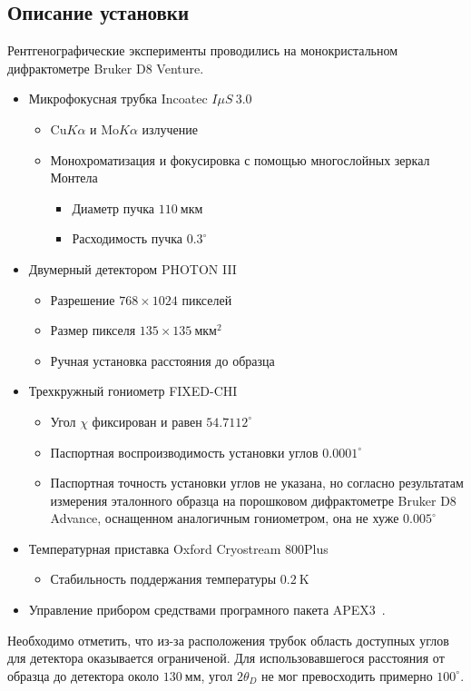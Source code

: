 \documentclass[a4paper, 12pt]{article}
\begin{document}
\subsection{Описание установки}
Рентгенографические эксперименты проводились на монокристальном дифрактометре Bruker D8 Venture.
\begin{itemize}
    \item Микрофокусная трубка Incoatec $I \mu S \ 3.0$
    \begin{itemize}
        \item $\text{Cu} K\alpha$ и $\text{Mo} K\alpha$ излучение
        \item Монохроматизация и фокусировка с помощью многослойных зеркал Монтела
        \begin{itemize}
            \item Диаметр пучка $110 \ \text{мкм}$
            \item Расходимость пучка $0.3^\circ$
        \end{itemize}
    \end{itemize}
    \item Двумерный детектором PHOTON III
    \begin{itemize}
        \item Разрешение $768 \times 1024$ пикселей
        \item Размер пикселя $135 \times 135 \ \text{мкм}^2$
        \item Ручная установка расстояния до образца
    \end{itemize}
    \item Трехкружный гониометр FIXED-CHI
    \begin{itemize}
        \item Угол $\chi$ фиксирован и равен $54.7112^\circ$
        \item Паспортная воспроизводимость установки углов $0.0001^\circ$
        \item Паспортная точность установки углов не указана, но согласно результатам измерения эталонного образца на порошковом дифрактометре Bruker D8 Advance, оснащенном аналогичным гониометром, она не хуже $0.005^\circ$
    \end{itemize}
    \item Температурная приставка Oxford Cryostream 800Plus
    \begin{itemize}
            \item Стабильность поддержания температуры $0.2 \ \text{K}$
    \end{itemize}
    \item Управление прибором средствами програмного пакета APEX3~\cite{Bruker:2019}.
\end{itemize}
Необходимо отметить, что из-за расположения трубок область доступных углов для детектора оказывается ограниченой.
Для использовавшегося расстояния от образца до детектора около $130 \ \text{мм}$, угол $2\theta_D$ не мог превосходить примерно $100^\circ$.
\end{document}
